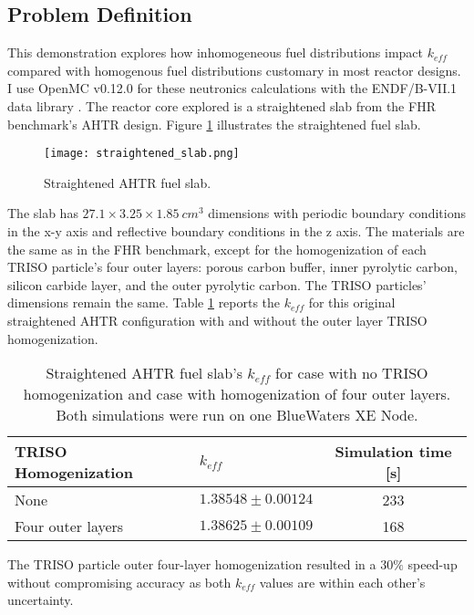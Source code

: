 \subsection{Problem Definition}
This demonstration explores how inhomogeneous fuel distributions impact $k_{eff}$ 
compared with homogenous fuel distributions customary in most reactor designs. 
I use OpenMC v0.12.0 for these neutronics calculations with the ENDF/B-VII.1
data library \cite{chadwick_endf/b-vii.1_2011}. 
The reactor core explored is a straightened slab from the \gls{FHR} benchmark's
\gls{AHTR} design.
Figure \ref{fig:straightened_slab} illustrates the straightened fuel slab. 
\begin{figure}[]
    \centering
    \texttt{[image: straightened\_slab.png]}
    \raggedright
    \caption{Straightened \acrfull{AHTR} fuel slab.}
    \label{fig:straightened_slab}
\end{figure}
The slab has $27.1 \times 3.25 \times 1.85\ cm^3$ dimensions
with periodic boundary conditions in the x-y axis and reflective 
boundary conditions in the z axis. 
The materials are the same as in the \gls{FHR} benchmark, except for 
the homogenization of each \gls{TRISO} particle's four outer layers: 
porous carbon buffer, inner pyrolytic carbon, silicon carbide layer, and the 
outer pyrolytic carbon. 
The \gls{TRISO} particles' dimensions remain the same.
Table \ref{tab:keff_triso} reports the $k_{eff}$ for this original straightened 
\gls{AHTR} configuration with and without the outer layer \gls{TRISO} 
homogenization.
\begin{table}[]
    \centering
    \onehalfspacing
    \caption{Straightened \acrfull{AHTR} fuel slab's $k_{eff}$ for case with 
    no \gls{TRISO} homogenization and case with homogenization of four outer 
    layers. Both simulations were run on one BlueWaters XE Node.}
	\label{tab:keff_triso}
    \footnotesize
    \begin{tabular}{llc}
    \hline 
    \textbf{TRISO Homogenization}& \textbf{$k_{eff}$} & \textbf{Simulation time [s]}  \\
    \hline 
    None & $1.38548 \pm 0.00124$ & 233\\ 
    Four outer layers & $1.38625 \pm 0.00109$ & 168\\ 
    \hline
    \end{tabular}
\end{table}
The \gls{TRISO} particle outer four-layer homogenization resulted in a $30\%$ 
speed-up without compromising accuracy as both $k_{eff}$ values are within 
each other's uncertainty.

